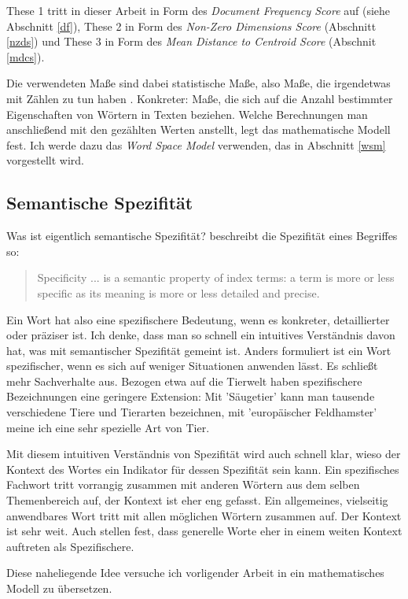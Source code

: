 \documentclass[11pt,numbers=noenddot]{scrartcl}
\begin{document}
These 1 tritt in dieser Arbeit in Form des \emph{Document Frequency Score} auf (siehe Abschnitt \ref{df}), These 2 in Form des \emph{Non-Zero Dimensions Score} (Abschnitt \ref{nzds}) und These 3 in Form des \emph{Mean Distance to Centroid Score} (Abschnit \ref{mdcs}).

Die verwendeten Maße sind dabei statistische Maße, also Maße, die irgendetwas mit Zählen zu tun haben \citep[S. 4]{manning1999}. Konkreter: Maße, die sich auf die Anzahl bestimmter Eigenschaften von Wörtern in Texten beziehen. Welche Berechnungen man anschließend mit den gezählten Werten anstellt, legt das mathematische Modell fest. Ich werde dazu das \emph{Word Space Model} verwenden, das in Abschnitt \ref{wsm} vorgestellt wird.

\subsection*{Semantische Spezifität}
Was ist eigentlich semantische Spezifität? \citet[S. 11]{sparckjones1972} beschreibt die Spezifität eines Begriffes so:
\begin{quote}
  Specificity ... is a semantic property of index terms: a term is more or less specific as its meaning is more or less detailed and precise.
\end{quote}

Ein Wort hat also eine spezifischere Bedeutung, wenn es konkreter, detaillierter oder präziser ist. Ich denke, dass man so schnell ein intuitives Verständnis davon hat, was mit semantischer Spezifität gemeint ist. Anders formuliert ist ein Wort spezifischer, wenn es sich auf weniger Situationen anwenden lässt. Es schließt mehr Sachverhalte aus. Bezogen etwa auf die Tierwelt haben spezifischere Bezeichnungen eine geringere Extension: Mit 'Säugetier' kann man tausende verschiedene Tiere und Tierarten bezeichnen, mit 'europäischer Feldhamster' meine ich eine sehr spezielle Art von Tier.

Mit diesem intuitiven Verständnis von Spezifität wird auch schnell klar, wieso der Kontext des Wortes ein Indikator für dessen Spezifität sein kann. Ein spezifisches Fachwort tritt vorrangig zusammen mit anderen Wörtern aus dem selben Themenbereich auf, der Kontext ist eher eng gefasst. Ein allgemeines, vielseitig anwendbares Wort tritt mit allen möglichen Wörtern zusammen auf. Der Kontext ist sehr weit. Auch \citet{weeds-weir-mccarthy} stellen fest, dass generelle Worte eher in einem weiten Kontext auftreten als Spezifischere.

Diese naheliegende Idee versuche ich vorligender Arbeit in ein mathematisches Modell zu übersetzen.
\end{document}
